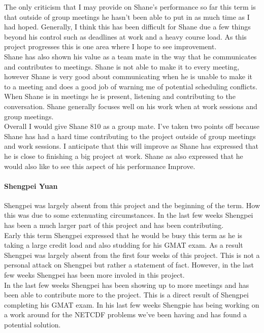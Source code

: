 \documentclass[onecolumn, draftclsnofoot,10pt, compsoc]{article}
\begin{document}
						The only criticism that I may provide on Shane's performance so far this term is that outside of group meetings he hasn't been able to put in as much time as I had hoped. Generally, I think this has been difficult for Shane due a few things beyond his control such as deadlines at work and a heavy course load. As this project progresses this is one area where I hope to see improvement.\\
		
			
			Shane has also shown his value as a team mate in the way that he communicates and contributes to meetings. Shane is not able to make it to every meeting, however Shane is very good about communicating when he is unable to make it to a meeting and does a good job of warning me of potential scheduling conflicts. When Shane is in meetings he is present, listening and contributing to the conversation. Shane generally focuses well on his work when at work sessions and group meetings.\\
			
			Overall I would give Shane 8\/10 as a group mate. I've taken two points off because Shane has had a hard time contributing to the project outside of group meetings and work sessions. I anticipate that this will improve as Shane has expressed that he is close to finishing a big project at work. Shane as also expressed that he would also like to see this aspect of his performance Improve.\\
			
		\paragraph{Shengpei Yuan} \hfill \break
		Shengpei was largely absent from this project and the beginning of the term. How this was due to some extenuating circumstances. In the last few weeks Shengpei has been a much larger part of this project and has been contributing.\\
		
		Early this term Shengpei expressed that he would be busy this term as he is taking a large credit load and also studding for his GMAT exam. As a result Shengpei was largely absent from the first four weeks of this project. This is not a personal attack on Shengpei but rather a statement of fact. However, in the last few weeks Shengpei has been more involed in this project.\\
		
		In the last few weeks Shengpei has been showing up to more meetings and has been able to contribute more to the project. This is a direct result of Shengpei completing his GMAT exam. In his last few weeks Shengpie has being working on a work around for the NETCDF problems we've been having and has found a potential solution.\\
		
\end{document}
